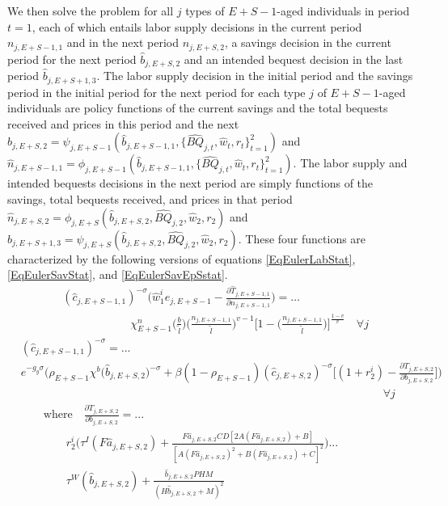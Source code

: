   We then solve the problem for all $j$ types of $E+S-1$-aged individuals in period $t=1$, each of which entails labor supply decisions in the current period $n_{j,E+S-1,1}$ and in the next period $n_{j,E+S,2}$, a savings decision in the current period for the next period $\hat{b}_{j,E+S,2}$ and an intended bequest decision in the last period $\hat{b}_{j,E+S+1,3}$. The labor supply decision in the initial period and the savings period in the initial period for the next period for each type $j$ of $E+S-1$-aged individuals are policy functions of the current savings and the total bequests received and prices in this period and the next $\hat{b}_{j,E+S,2} = \psi_{j,E+S-1}(\hat{b}_{j,E+S-1,1},\{\hat{BQ}_{j,t},\hat{w}_t,r_t\}_{t=1}^2)$ and $\hat{n}_{j,E+S-1,1} = \phi_{j,E+S-1}(\hat{b}_{j,E+S-1,1},\{\hat{BQ}_{j,t},\hat{w}_t,r_t\}_{t=1}^2)$. The labor supply and intended bequests decisions in the next period are simply functions of the savings, total bequests received, and prices in that period $\hat{n}_{j,E+S,2} = \phi_{j,E+S}(\hat{b}_{j,E+S,2},\hat{BQ}_{j,2},\hat{w}_2,r_2)$ and $\hat{b}_{j,E+S+1,3} = \psi_{j,E+S}(\hat{b}_{j,E+S,2},\hat{BQ}_{j,2},\hat{w}_2,r_2)$. These four functions are characterized by the following versions of equations \eqref{EqEulerLabStat}, \eqref{EqEulerSavStat}, and \eqref{EqEulerSavEpSstat}.
  \begin{equation}\label{EqEulerSm1labt1}
    \begin{split}
      &(\hat{c}_{j,E+S-1,1})^{-\sigma}\Biggl(\hat{w}_1^i e_{j,E+S-1} - \frac{\partial\hat{T}_{j,E+S-1,1}}{\partial n_{j,E+S-1,1}}\Biggr) = ... \\
      &\qquad\qquad\qquad \chi^n_{E+S-1}\biggl(\frac{b}{\tilde{l}}\biggr)\biggl(\frac{n_{j,E+S-1,1}}{\tilde{l}}\biggr)^{v-1}\Biggl[1 - \biggl(\frac{n_{j,E+S-1,1}}{\tilde{l}}\biggr)\Biggr]^{\frac{1-v}{v}} \quad\forall j
    \end{split}
  \end{equation}
  \begin{equation}\label{EqEulerSm1savt1}
    \begin{split}
      &(\hat{c}_{j,E+S-1,1})^{-\sigma} = ... \\
      &e^{-g_y\sigma}\Biggl(\rho_{E+S-1}\chi^b \bigl(\hat{b}_{j,E+S,2}\bigr)^{-\sigma} + \beta(1-\rho_{E+S-1})(\hat{c}_{j,E+S,2})^{-\sigma}\Biggl[(1 + r_2^i) - \frac{\partial T_{j,E+S,2}}{\partial b_{j,E+S,2}}\Biggr]\Biggr) \\
      &\qquad\qquad\qquad\qquad\qquad\qquad\qquad\qquad\qquad\qquad\qquad\qquad\qquad\qquad\qquad\qquad\forall j \\
      &\qquad\text{where}\quad \frac{\partial T_{j,E+S,2}}{\partial b_{j,E+S,2}} = ...\\
      &\qquad\qquad r_2^i\Biggl(\tau^I(F\hat{a}_{j,E+S,2}) + \frac{F\hat{a}_{j,E+S,2}CD\left[2A(F\hat{a}_{j,E+S,2}) + B\right]}{\left[A(F\hat{a}_{j,E+S,2})^2 + B(F\hat{a}_{j,E+S,2}) + C\right]^2}\Biggr) ... \\
      &\qquad\qquad \tau^W(\hat{b}_{j,E+S,2}) + \frac{\hat{b}_{j,E+S,2}PHM}{\left(H\hat{b}_{j,E+S,2} + M\right)^2}
    \end{split}
  \end{equation}
